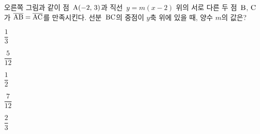 \noindent\begin{minipage}[t]{0.58\linewidth}\vspace{0pt}\raggedright 오른쪽 그림과 같이 점~$\mathrm{A}(-2,\mkern3mu 3)$과 직선~$y=m(x-2)$ 위의 서로 다른 두 점~$\mathrm{B}$, $\mathrm{C}$가 $\overline{\mathrm{AB}}=\overline{\mathrm{AC}}$를 만족시킨다. 선분~$\mathrm{BC}$의 중점이 $y$축 위에 있을 때, 양수 $m$의 값은?\end{minipage}\hfill\begin{minipage}[t]{0.4\linewidth}\vspace{0pt}\centering \resizebox{\ifdim\width>\linewidth\linewidth\else\width\fi}{!}{}\end{minipage}\par
\begin{choices32}{\rule[-3ex]{0pt}{8ex}$\dfrac{1}{3}$}{\rule[-3ex]{0pt}{8ex}$\dfrac{5}{12}$}{\rule[-3ex]{0pt}{8ex}$\dfrac{1}{2}$}{\rule[-3ex]{0pt}{8ex}$\dfrac{7}{12}$}{\rule[-3ex]{0pt}{8ex}$\dfrac{2}{3}$}\end{choices32}
